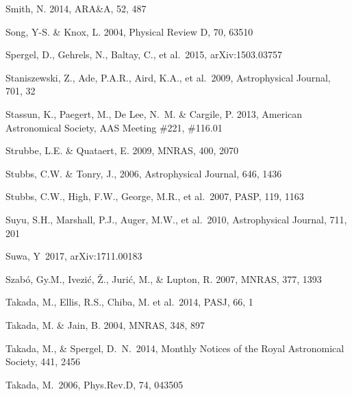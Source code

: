 \documentclass[twocolumn]{aastex61}
\begin{document}
\begin{thebibliography}{}
 Smith, N. 2014, ARA\&A, 52, 487

 Song, Y-S. \& Knox, L. 2004, Physical Review D, 70, 63510

 Spergel, D., Gehrels, N., Baltay, C., et al.~2015, arXiv:1503.03757



 Staniszewski, Z., Ade, P.A.R., Aird, K.A., et al.~2009,  Astrophysical  Journal, 701, 32

 Stassun, K., Paegert, M., De Lee, N.~M. \& Cargile, P. 2013, American Astronomical Society, AAS Meeting \#221, \#116.01

 Strubbe, L.E. \& Quataert, E. 2009, MNRAS, 400, 2070

 Stubbs, C.W. \& Tonry, J., 2006, Astrophysical Journal, 646, 1436

 Stubbs, C.W., High, F.W., George, M.R., et al.~2007, PASP, 119, 1163

 Suyu, S.H., Marshall, P.J., Auger, M.W., et al.~2010, Astrophysical Journal, 711, 201

 Suwa, Y~2017, arXiv:1711.00183

 Szab\'o, Gy.M., Ivezi\'c, \v{Z}., Juri\'c, M., \& Lupton, R. 2007, MNRAS, 377, 1393

 Takada, M., Ellis, R.S., Chiba, M. et al.~2014, PASJ, 66, 1

 Takada, M. \& Jain, B. 2004, MNRAS, 348, 897

 Takada, M., \& Spergel, D.~N.~2014, Monthly Notices of the Royal Astronomical Society, 441, 2456

 Takada, M.\ 2006, Phys.Rev.D, 74, 043505


\end{thebibliography}
\end{document}
